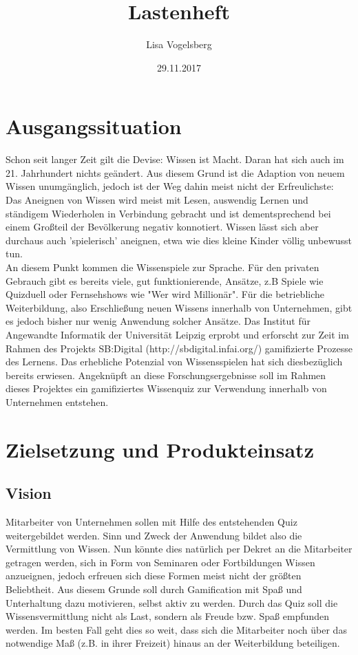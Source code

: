 \documentclass[11pt,a4paper]{scrreprt}
\title{Lastenheft}
\author{Lisa Vogelsberg}
\date{29.11.2017}
\begin{document}
\tableofcontents

\chapter{Ausgangssituation}
Schon seit langer Zeit gilt die Devise: Wissen ist Macht. Daran hat sich auch im 21. Jahrhundert nichts geändert. Aus diesem Grund ist die Adaption von neuem Wissen unumgänglich, jedoch ist der Weg dahin meist nicht der Erfreulichste: Das Aneignen von Wissen wird meist mit Lesen, auswendig Lernen und ständigem Wiederholen in Verbindung gebracht und ist dementsprechend bei einem Großteil der Bevölkerung negativ konnotiert. Wissen lässt sich aber durchaus auch 'spielerisch' aneignen, etwa wie dies kleine Kinder völlig unbewusst tun.\\
An diesem Punkt kommen die Wissenspiele zur Sprache. Für den privaten Gebrauch gibt es bereits viele, gut funktionierende, Ansätze, z.B Spiele wie Quizduell oder Fernsehshows wie "Wer wird Millionär". Für die betriebliche Weiterbildung, also Erschließung neuen Wissens innerhalb von Unternehmen, gibt es jedoch bisher nur wenig Anwendung solcher Ansätze. Das Institut für Angewandte Informatik der Universität Leipzig erprobt und erforscht zur Zeit im Rahmen des Projekts SB:Digital (http://sbdigital.infai.org/) gamifizierte Prozesse des Lernens.
Das erhebliche Potenzial von Wissensspielen hat sich diesbezüglich bereits erwiesen. Angeknüpft an diese Forschungsergebnisse soll im Rahmen dieses Projektes ein gamifiziertes Wissenquiz zur Verwendung innerhalb von Unternehmen entstehen.
\chapter{Zielsetzung und Produkteinsatz}
\section{Vision}
Mitarbeiter von Unternehmen sollen mit Hilfe des entstehenden Quiz weitergebildet werden. Sinn und Zweck der Anwendung bildet also die Vermittlung von Wissen. Nun könnte dies natürlich per Dekret an die Mitarbeiter getragen werden, sich in Form von Seminaren oder Fortbildungen Wissen anzueignen, jedoch erfreuen sich diese Formen meist nicht der größten Beliebtheit. Aus diesem Grunde soll durch Gamification mit Spaß und Unterhaltung dazu motivieren, selbst aktiv zu werden. Durch das Quiz soll die Wissensvermittlung nicht als Last, sondern als Freude bzw. Spaß empfunden werden. Im besten Fall geht dies so weit, dass sich die Mitarbeiter noch über das notwendige Maß (z.B. in ihrer Freizeit) hinaus an der Weiterbildung beteiligen. 
\end{document}
